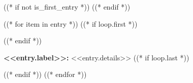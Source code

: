 ((* if not is_first_entry *))
\vspace{<<design.margins.entry_area.vertical_between>>}
((* endif *))

((* for item in entry *))
    ((* if loop.first *))
\begin{onecolentry}
    \begin{highlights}
    ((* endif *))
        \item \textbf{<<entry.label>>:} <<entry.details>>
    ((* if loop.last *))
    \end{highlights}
\end{onecolentry}
    ((* endif *))
((* endfor *))
